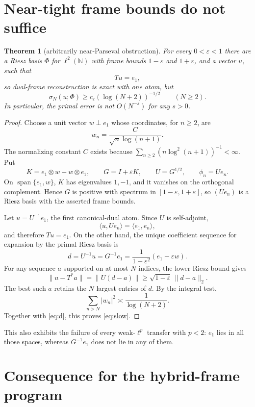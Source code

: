 \documentclass[11pt]{article}
\newtheorem{theorem}{Theorem}
\newcommand{\eps}{\varepsilon}
\begin{document}
\section{Near-tight frame bounds do not suffice}

\begin{theorem}[arbitrarily near-Parseval obstruction]\label{thm:no-go}
For every $0<\eps<1$ there are a Riesz basis $\Phi$ for $\ell^2(\mathbb N)$
with frame bounds $1-\eps$ and $1+\eps$, and a vector $u$, such that
\[
 Tu=e_1,
\]
so dual-frame reconstruction is exact with one atom, but
\begin{equation}\label{eq:slow}
 \sigma_N(u;\Phi)\ge c_\eps(\log(N+2))^{-1/2}
 \qquad(N\ge2).
\end{equation}
In particular, the primal error is not $O(N^{-s})$ for any $s>0$.
\end{theorem}

\begin{proof}
Choose a unit vector $w\perp e_1$ whose coordinates, for $n\ge2$, are
\[
 w_n=\frac{C}{\sqrt n\log(n+1)}.
\]
The normalizing constant $C$ exists because
$\sum_{n\ge2}(n\log^2(n+1))^{-1}<\infty$.  Put
\[
 K=e_1\otimes w+w\otimes e_1,
 \qquad G=I+\eps K,
 \qquad U=G^{1/2},
 \qquad \phi_n=Ue_n.
\]
On $\operatorname{span}\{e_1,w\}$, $K$ has eigenvalues $1,-1$, and it
vanishes on the orthogonal complement.  Hence $G$ is positive with spectrum
in $[1-\eps,1+\eps]$, so $(Ue_n)$ is a Riesz basis with the asserted frame
bounds.

Let $u=U^{-1}e_1$, the first canonical-dual atom.  Since $U$ is
self-adjoint,
\[
 \langle u,Ue_n\rangle=\langle e_1,e_n\rangle,
\]
and therefore $Tu=e_1$.  On the other hand, the unique coefficient sequence
for expansion by the primal Riesz basis is
\begin{equation}\label{eq:d}
 d=U^{-1}u=G^{-1}e_1
   =\frac{1}{1-\eps^2}(e_1-\eps w).
\end{equation}
For any sequence $a$ supported on at most $N$ indices, the lower Riesz bound
gives
\[
 \|u-T^*a\|=\|U(d-a)\|\ge\sqrt{1-\eps}\,\|d-a\|_2.
\]
The best such $a$ retains the $N$ largest entries of $d$.  By the integral
test,
\[
 \sum_{n>N}|w_n|^2\asymp\frac{1}{\log(N+2)}.
\]
Together with \eqref{eq:d}, this proves \eqref{eq:slow}.
\end{proof}

This also exhibits the failure of every weak-$\ell^p$ transfer with $p<2$:
$e_1$ lies in all those spaces, whereas $G^{-1}e_1$ does not lie in any of
them.

\section{Consequence for the hybrid-frame program}
\end{document}
